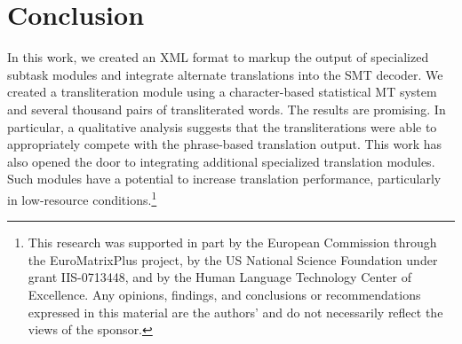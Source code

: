 \documentclass[logo]{pbml}
\begin{document}
\section{Conclusion}
\vspace{-.15cm}
In this work, we created an XML format to markup the output of specialized subtask modules and integrate alternate translations into the SMT decoder. We created a transliteration module using a character-based statistical MT system and several thousand pairs of transliterated words.  The results are promising. In particular, a qualitative analysis suggests that the transliterations were able to appropriately compete with the phrase-based translation output. This work has also opened the door to integrating additional specialized translation modules. Such modules have a potential to increase translation performance, particularly in low-resource conditions.\footnote{This research was supported in part by the European Commission through the EuroMatrixPlus project, by the US National Science Foundation under grant IIS-0713448, and by the Human Language Technology Center of Excellence.  Any opinions, findings, and conclusions or recommendations expressed in this material are the authors' and do not necessarily reflect the views of the sponsor. }



\end{document}
